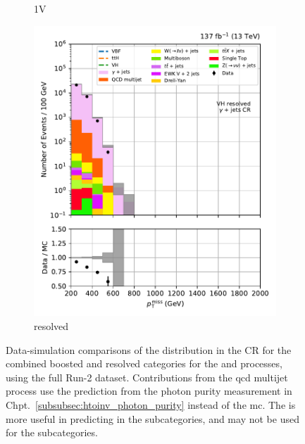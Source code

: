 \begin{figure}[htbp]
\begin{subfigure}[b]{0.24\textwidth}
        \caption{\VH 1V}
    \end{subfigure}
    \hfill
    \begin{subfigure}[b]{0.24\textwidth}
        \includegraphics[width=\textwidth]{figures/region_plots/full_Run2/region_5/VH_resolved.pdf}
        \caption{\VH resolved}
    \end{subfigure}
    \caption[Data-simulation comparisons of the \ptmiss distribution in the \singlePhotonCr control region for the combined boosted and resolved categories for the \ttH and \VH processes, using the full Run-2 dataset]{Data-simulation comparisons of the \ptmiss distribution in the \singlePhotonCr \gls{CR} for the combined boosted and resolved categories for the \ttH and \VH processes, using the full Run-2 dataset. Contributions from the \acrshort{qcd} multijet process use the prediction from the photon purity measurement in Chpt.~\ref{subsubsec:htoinv_photon_purity} instead of the \acrshort{mc}. The \singlePhotonCr is more useful in predicting \ztonunupjets in the \VH subcategories, and may not be used for the \ttH subcategories.}
    \label{fig:htoinv_cr_yields_comb2016to18_single_photon}
\end{figure}

